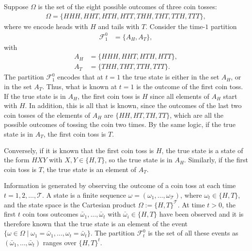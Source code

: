 \documentclass[\topdir/lecture\_notes.tex]{subfiles}
\begin{document}
\begin{example}\label{ex:three_coin_tosses}
Suppose \(\Omega\) is the set of the eight possible outcomes of three coin tosses:
\begin{align*}
\Omega=\{H H H, H H T, H T H, H T T, T H H, T H T, T T H, T T T\},
\end{align*}
where we encode heads with \(H\) and tails with \(T\). Consider the time-\(1\) partition
\begin{align*}
\mathcal{F}_{1}^{0}&=\{A_{H},A_{T}\},
\end{align*}
with%
\begin{align*}
A_{H}&=\{H H H, H H T, H T H, H T T\},\\
A_{T}&=\{T H H, T H T, T T H, T T T\}.
\end{align*}
The partition \(\mathcal{F}_{1}^{0}\) encodes that at \(t=1\) the true state is either in the set \(A_{H}\), or in the set \(A_{T}\). Thus, what is known at \(t=1\) is the outcome of the first coin toss. If the true state is in \(A_{H}\), the first coin toss is \(H\) since all elements of \(A_{H}\) start with \(H\). In addition, this is all that is known, since the outcomes of the last two coin tosses of the elements of \(A_{H}\) are \(\{H H, H T, T H, T T\}\), which are all the possible outcomes of tossing the coin two times. By the same logic, if the true state is in \(A_{T}\), the first coin toss is \(T\).

Conversely, if it is known that the first coin toss is \(H\), the true state is a state of the form \(H X Y\) with \(X,Y\in \{H,T\}\), so the true state is in \(A_{H}\). Similarly, if the first coin toss is \(T\), the true state is an element of \(A_{T}\).
\end{example}

\begin{example}\label{ex:coin_toss}
Information is generated by observing the outcome of a coin toss at each time \(t=1,2, \ldots, \mathcal{T}\). A state is a finite sequence \(\omega=(\omega_{1}, \ldots, \omega_{\mathcal{T}})\), where \(\omega_{t} \in\{H, T\}\), and the state space is the Cartesian product \(\Omega := \{H, T\}^{\mathcal{T}}\). At time \(t>0\), the first \(t\) coin toss outcomes \(\bar{\omega}_{1}, \ldots, \bar{\omega}_{t}\) with \(\bar{\omega}_{i} \in \{H, T\}\) have been observed and it is therefore known that the true state is an element of the event \(\{\omega \in \Omega \mid \omega_{1}=\bar{\omega}_{1}, \ldots, \omega_{t}=\bar{\omega}_{t}\}\). The partition \(\mathcal{F}_{t}^{0}\) is the set of all these events as \((\bar{\omega}_{1}, \ldots, \bar{\omega}_{t})\) ranges over \(\{H, T\}^{t}\).
\end{example}
\end{document}
